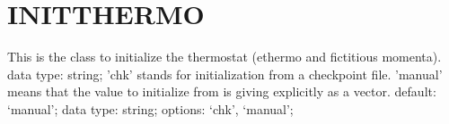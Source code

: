 \section{INITTHERMO}
\label{INITTHERMO}
\begin{ipifield}{}%
{This is the class to initialize the thermostat (ethermo and fictitious momenta).}%
{data type: string; }%
{%
{'chk' stands for initialization from a checkpoint file. 'manual' means that the value to initialize from is giving explicitly as a vector.}%
{default: `manual'; data type: string; options: `chk', `manual'; }%
}
\end{ipifield}
